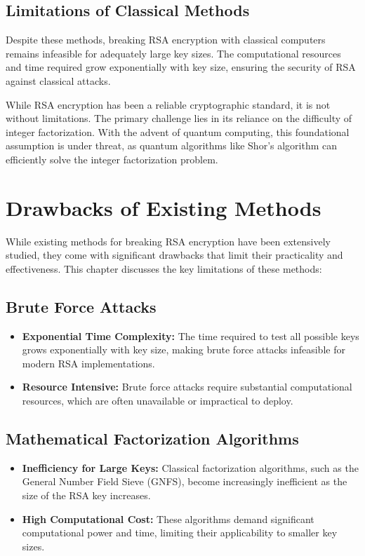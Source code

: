 \documentclass[12pt,a4paper]{report}
\begin{document}
\section{Limitations of Classical Methods}
Despite these methods, breaking RSA encryption with classical computers remains infeasible for adequately large key sizes. The computational resources and time required grow exponentially with key size, ensuring the security of RSA against classical attacks.

While RSA encryption has been a reliable cryptographic standard, it is not without limitations. The primary challenge lies in its reliance on the difficulty of integer factorization. With the advent of quantum computing, this foundational assumption is under threat, as quantum algorithms like Shor's algorithm can efficiently solve the integer factorization problem.

\chapter{Drawbacks of Existing Methods}
While existing methods for breaking RSA encryption have been extensively studied, they come with significant drawbacks that limit their practicality and effectiveness. This chapter discusses the key limitations of these methods:

\section{Brute Force Attacks}
\begin{itemize}
    \item \textbf{Exponential Time Complexity:} The time required to test all possible keys grows exponentially with key size, making brute force attacks infeasible for modern RSA implementations.
    \item \textbf{Resource Intensive:} Brute force attacks require substantial computational resources, which are often unavailable or impractical to deploy.
\end{itemize}

\section{Mathematical Factorization Algorithms}
\begin{itemize}
    \item \textbf{Inefficiency for Large Keys:} Classical factorization algorithms, such as the General Number Field Sieve (GNFS), become increasingly inefficient as the size of the RSA key increases.
    \item \textbf{High Computational Cost:} These algorithms demand significant computational power and time, limiting their applicability to smaller key sizes.
\end{itemize}
\end{document}
